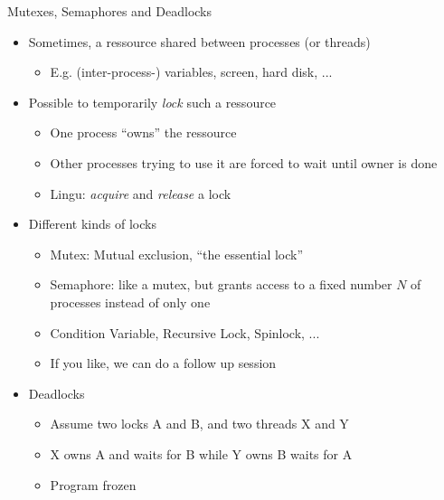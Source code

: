 \begin{frame}{Mutexes, Semaphores and Deadlocks}
%
\begin{itemize}
\item Sometimes, a ressource shared between processes (or threads)
	\begin{itemize}
	\item E.\;g. (inter-process-) variables, screen, hard disk, ... 
	\end{itemize}
\item Possible to temporarily \emph{lock} such a ressource
	\begin{itemize}
	\item One process \enquote{owns} the ressource
	\item Other processes trying to use it are forced to wait until owner is done
	\item Lingu: \emph{acquire} and \emph{release} a lock
	\end{itemize}
\item Different kinds of locks
	\begin{itemize}
	\item Mutex: Mutual exclusion, \enquote{the essential lock}
	\item Semaphore: like a mutex, but grants access to a fixed number $N$ of processes instead of only one
	\item Condition Variable, Recursive Lock, Spinlock, ... 
	\item If you like, we can do a follow up session
	\end{itemize}
\item Deadlocks
	\begin{itemize}
	\item Assume two locks A and B, and two threads X and Y
	\item X owns A and waits for B while Y owns B waits for A
	\item[\Thus] Program frozen
	\end{itemize}
\end{itemize}
%
\end{frame}


